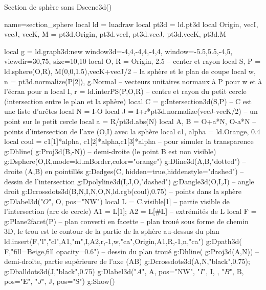 \begin{demo}{Section de sphère sans Dscene3d()}
\begin{luadraw}{name=section_sphere}
local ld = luadraw
local pt3d = ld.pt3d
local Origin, vecI, vecJ, vecK, M = pt3d.Origin, pt3d.vecI, pt3d.vecJ, pt3d.vecK, pt3d.M

local g = ld.graph3d:new{ window3d={-4,4,-4,4,-4,4}, window={-5.5,5.5,-4,5}, viewdir={30,75}, size={10,10}}
local O, R = Origin, 2.5 -- center et rayon
local S, P = ld.sphere(O,R), {M(0,0,1.5),vecK+vecJ/2} -- la sphère et le plan de coupe
local w, n = pt3d.normalize(P[2]), g.Normal -- vecteurs unitaires normaux à P pour w et à l'écran pour n
local I, r = ld.interPS(P,{O,R}) -- centre et rayon du petit cercle (intersection entre le plan et la sphère)
local C = g:Intersection3d(S,P) -- C est une liste d'arêtes
local N = I-O
local J = I+r*pt3d.normalize(vecJ-vecK/2) -- un point sur le petit cercle
local a = R/pt3d.abs(N)
local A, B = O+a*N, O-a*N -- points d'intersection de l'axe (O,I) avec la sphère
local c1, alpha = ld.Orange, 0.4
local coul = {c1[1]*alpha, c1[2]*alpha,c1[3]*alpha} -- pour simuler la transparence
g:Dhline( g:Proj3d({B,-N})) -- demi-droite (le point B est non visible)
g:Dsphere(O,R,{mode=ld.mBorder,color="orange"})
g:Dline3d(A,B,"dotted") -- droite (A,B) en pointillés
g:Dedges(C, {hidden=true,hiddenstyle="dashed"}) -- dessin de l'intersection
g:Dpolyline3d({I,J,O},"dashed")
g:Dangle3d(O,I,J) -- angle droit
g:Dcrossdots3d({{B,N},{I,N},{O,N}},ld.rgb(coul),0.75) -- points dans la sphère
g:Dlabel3d("$O$", O, {pos="NW"})
local L = C.visible[1] -- partie visible de l'intersection (arc de cercle)
A1 = L[1]; A2 = L[#L] -- extrémités de L
local F = g:Plane2facet(P) -- plan converti en facette
-- plan troué sous forme de chemin 3D, le trou est le contour de la partie de la sphère au-dessus du plan
ld.insert(F,{"l","cl",A1,"m",I,A2,r,-1,w,"ca",Origin,A1,R,-1,n,"ca"})
g:Dpath3d( F,"fill=Beige,fill opacity=0.6") -- dessin du plan troué
g:Dhline( g:Proj3d({A,N})) -- demi-droite, partie supérieure de l'axe (AB)
g:Dcrossdots3d({A,N},"black",0.75); g:Dballdots3d(J,"black",0.75)
g:Dlabel3d("$A$", A, {pos="NW"}, "$I$", I, {}, "$B$", B, {pos="E"}, "$J$", J, {pos="S"})
g:Show()
\end{luadraw}
\end{demo}
